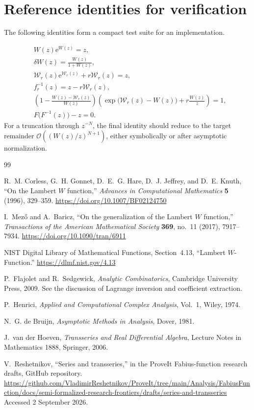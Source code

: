\documentclass[11pt]{article}
\theoremstyle{clean}
\newcommand{\rLambert}{\mathcal W}
\newcommand{\e}{\mathrm e}
\newcommand{\bigO}{\mathcal O}
\begin{document}
\section{Reference identities for verification}

The following identities form a compact test suite for an implementation.

\begin{align*}
& W(z)\e^{W(z)}=z,\\
& \delta W(z)=\frac{W(z)}{1+W(z)},\\
& \rLambert_r(z)\e^{\rLambert_r(z)}
  +r\rLambert_r(z)=z,\\
& f_r^{-1}(z)=z-r\rLambert_r(z),\\
& \left(1-\frac{W(z)-\rLambert_r(z)}{W(z)}\right)
  \left(\exp\!\bigl(\rLambert_r(z)-W(z)\bigr)
        +r\frac{W(z)}{z}\right)=1,\\
& F\bigl(F^{-1}(z)\bigr)-z=0.
\end{align*}
For a truncation through \(z^{-N}\), the final identity should reduce to the
target remainder \(\bigO((W(z)/z)^{N+1})\), either symbolically or after
asymptotic normalization.

\clearpage
\begin{thebibliography}{99}

R.~M. Corless, G.~H. Gonnet, D.~E.~G. Hare, D.~J. Jeffrey, and D.~E. Knuth,
``On the Lambert \(W\) function,''
\emph{Advances in Computational Mathematics} \textbf{5} (1996), 329--359.
\url{https://doi.org/10.1007/BF02124750}

I.~Mez\H{o} and A.~Baricz,
``On the generalization of the Lambert \(W\) function,''
\emph{Transactions of the American Mathematical Society}
\textbf{369}, no.~11 (2017), 7917--7934.
\url{https://doi.org/10.1090/tran/6911}

NIST Digital Library of Mathematical Functions,
Section~4.13, ``Lambert \(W\)-Function.''
\url{https://dlmf.nist.gov/4.13}

P.~Flajolet and R.~Sedgewick,
\emph{Analytic Combinatorics}, Cambridge University Press, 2009.
See the discussion of Lagrange inversion and coefficient extraction.

P.~Henrici,
\emph{Applied and Computational Complex Analysis}, Vol.~1,
Wiley, 1974.

N.~G. de Bruijn,
\emph{Asymptotic Methods in Analysis}, Dover, 1981.

J.~van der Hoeven,
\emph{Transseries and Real Differential Algebra},
Lecture Notes in Mathematics 1888, Springer, 2006.

V.~Reshetnikov,
``Series and transseries,'' in the ProveIt Fabius-function research drafts,
GitHub repository.
\url{https://github.com/VladimirReshetnikov/ProveIt/tree/main/Analysis/FabiusFunction/docs/semi-formalized-research-frontiers/drafts/series-and-transseries}
Accessed 2 September 2026.

\end{thebibliography}
\end{document}
